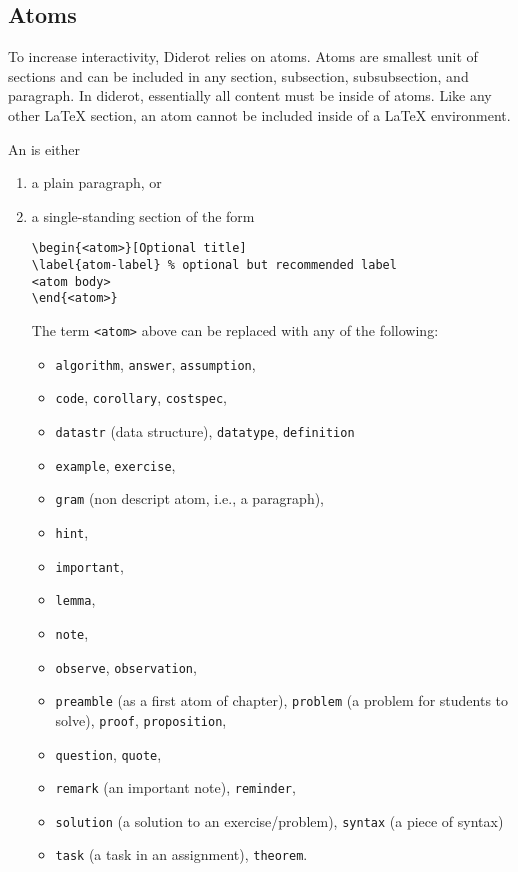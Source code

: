 \subsection{Atoms}
\label{sec:mtl::atoms}


\begin{definition}[Atom]
To increase interactivity, Diderot relies on atoms.
%
Atoms are smallest unit of sections and can be included in any section, subsection, subsubsection, and paragraph.
%
In diderot, essentially all content  must be inside of atoms.
%
Like any other LaTeX section, an atom cannot be included inside of a
LaTeX environment.
%

An  is either
\begin{enumerate}
\item a plain paragraph, or
\item a single-standing section of the form

\begin{lstlisting}
\begin{<atom>}[Optional title]
\label{atom-label} % optional but recommended label
<atom body>
\end{<atom>}
\end{lstlisting}
%
The term \lstinline`<atom>` above can be replaced with any of the following:
\begin{itemize}
\item \lstinline`algorithm`, \lstinline`answer`, \lstinline`assumption`,
\item \lstinline`code`, \lstinline`corollary`, \lstinline`costspec`,
\item \lstinline`datastr` (data structure), \lstinline`datatype`, \lstinline`definition`
\item \lstinline`example`, \lstinline`exercise`,
\item \lstinline`gram`  (non descript atom, i.e., a paragraph),
\item \lstinline`hint`, 
\item \lstinline`important`, 
\item \lstinline`lemma`,
\item \lstinline`note`,
\item \lstinline`observe`, \lstinline`observation`,
\item \lstinline`preamble` (as a  first atom of chapter), \lstinline`problem` (a problem for students to solve), \lstinline`proof`, \lstinline`proposition`,
\item \lstinline`question`, \lstinline`quote`,
\item \lstinline`remark` (an important note), \lstinline`reminder`,
\item \lstinline`solution` (a solution to an exercise/problem), \lstinline`syntax` (a piece of syntax)
\item \lstinline`task` (a task in an assignment), \lstinline`theorem`.
\end{itemize}
\end{enumerate}

\end{definition}

